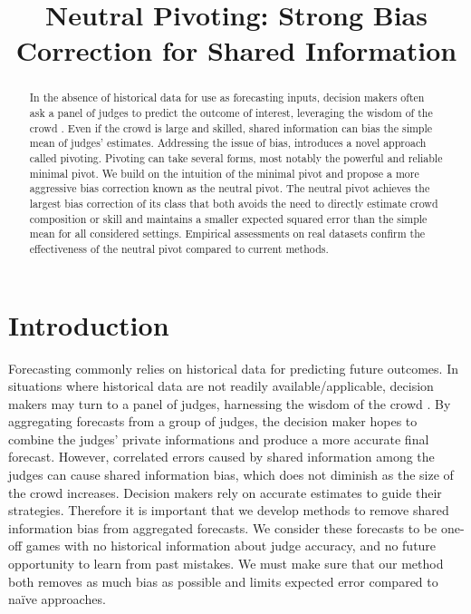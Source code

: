 
\title{Neutral Pivoting: Strong Bias Correction for Shared Information}
\maketitle
\begin{abstract}
    In the absence of historical data for use as forecasting inputs, decision makers often ask a panel of judges to predict the outcome of interest, leveraging the wisdom of the crowd \citep{woc}. Even if the crowd is large and skilled, shared information can bias the simple mean of judges’ estimates. Addressing the issue of bias, \cite{mp} introduces a novel approach called pivoting. Pivoting can take several forms, most notably the powerful and reliable minimal pivot. We build on the intuition of the minimal pivot and propose a more aggressive bias correction known as the neutral pivot. The neutral pivot achieves the largest bias correction of its class that both avoids the need to directly estimate crowd composition or skill and maintains a smaller expected squared error than the simple mean for all considered settings. Empirical assessments on real datasets confirm the effectiveness of the neutral pivot compared to current methods.
\end{abstract}

\section{Introduction}

Forecasting commonly relies on historical data for predicting future outcomes. In situations where historical data are not readily available/applicable, decision makers may turn to a panel of judges, harnessing the wisdom of the crowd \citep{woc}. By aggregating forecasts from a group of judges, the decision maker hopes to combine the judges’ private informations and produce a more accurate final forecast. However, correlated errors caused by shared information among the judges can cause shared information bias, which does not diminish as the size of the crowd increases. Decision makers rely on accurate estimates to guide their strategies. Therefore it is important that we develop methods to remove shared information bias from aggregated forecasts. We consider these forecasts to be one-off games with no historical information about judge accuracy, and no future opportunity to learn from past mistakes. We must make sure that our method both removes as much bias as possible and limits expected error compared to naïve approaches. 
    
